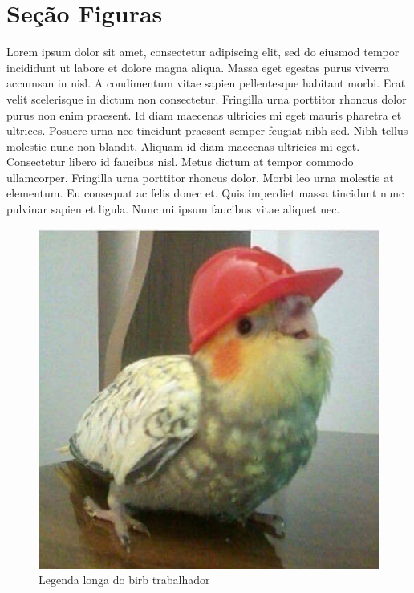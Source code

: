 \documentclass[12pt]{article}
\begin{document}
	\section{Seção Figuras}
		Lorem ipsum dolor sit amet, consectetur adipiscing elit, sed do eiusmod tempor incididunt ut labore et dolore magna aliqua. Massa eget egestas purus viverra accumsan in nisl. A condimentum vitae sapien pellentesque habitant morbi. Erat velit scelerisque in dictum non consectetur. Fringilla urna porttitor rhoncus dolor purus non enim praesent. Id diam maecenas ultricies mi eget mauris pharetra et ultrices. Posuere urna nec tincidunt praesent semper feugiat nibh sed. Nibh tellus molestie nunc non blandit. Aliquam id diam maecenas ultricies mi eget. Consectetur libero id faucibus nisl. Metus dictum at tempor commodo ullamcorper. Fringilla urna porttitor rhoncus dolor. Morbi leo urna molestie at elementum. Eu consequat ac felis donec et. Quis imperdiet massa tincidunt nunc pulvinar sapien et ligula. Nunc mi ipsum faucibus vitae aliquet nec.
		
		\begin{figure}[H] %
			\centering
			\includegraphics[width=0.7\linewidth]{figuras/birb_01}
			\caption[Legenda curta do birb trabalhador]{Legenda longa do birb trabalhador}
			\label{fig:birb01}
		\end{figure}
\end{document}
